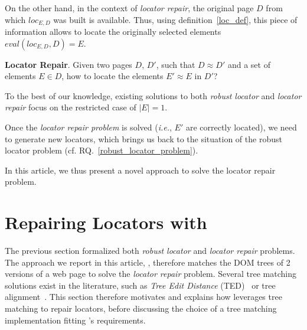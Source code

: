\documentclass[preprint, 12pt]{elsarticle}
\begin{document}
On the other hand, in the context of \textit{locator repair}, the original page $D$ from which $loc_{E,D}$ was built is available.
Thus, using definition~\ref{loc_def}, this piece of information allows to locate the originally selected elements $eval(loc_{E,D}, D) = E$.

\begin{rqn}\label{locator_repair_problem}
    \textbf{Locator Repair}. 
    Given two pages $D$, $D'$, such that $D \approx D'$ and a set of elements $E\in D$, how to locate the elements $E' \approx E$ in $D'$?
\end{rqn}
To the best of our knowledge, existing solutions to both \emph{robust locator} and \emph{locator repair} focus on the restricted case of $|E| = 1$.

Once the \textit{locator repair problem} is solved (\emph{i.e.}, $E'$ are correctly located), we need to generate new locators, which brings us back to the situation of the robust locator problem (cf. RQ.~\ref{robust_locator_problem}).

In this article, we thus present a novel approach to solve the locator repair problem.


\section{Repairing Locators with \erratum}\label{sec:implementation}
The previous section formalized both \emph{robust locator} and \emph{locator repair} problems.
The approach we report in this article, \erratum, therefore matches the DOM trees of 2 versions of a web page to solve the \emph{locator repair} problem.
Several tree matching solutions exist in the literature, such as \emph{Tree Edit Distance} (TED)~\cite{tai1979tree} or tree alignment~\cite{jiang1994alignment}.
This section therefore motivates and explains how \erratum leverages tree matching to repair locators, before discussing the choice of a tree matching implementation fitting \erratum's requirements.
\end{document}
